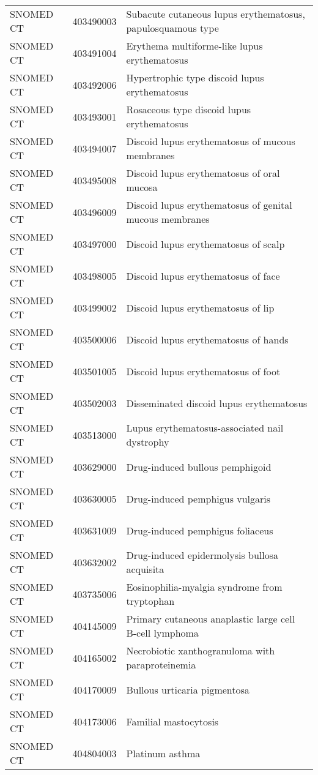 \begin{longtable}{p{}p{}p{}}
  SNOMED CT & 403490003 & Subacute cutaneous lupus erythematosus, papulosquamous type \\ 
  SNOMED CT & 403491004 & Erythema multiforme-like lupus erythematosus \\ 
  SNOMED CT & 403492006 & Hypertrophic type discoid lupus erythematosus \\ 
  SNOMED CT & 403493001 & Rosaceous type discoid lupus erythematosus \\ 
  SNOMED CT & 403494007 & Discoid lupus erythematosus of mucous membranes \\ 
  SNOMED CT & 403495008 & Discoid lupus erythematosus of oral mucosa \\ 
  SNOMED CT & 403496009 & Discoid lupus erythematosus of genital mucous membranes \\ 
  SNOMED CT & 403497000 & Discoid lupus erythematosus of scalp \\ 
  SNOMED CT & 403498005 & Discoid lupus erythematosus of face \\ 
  SNOMED CT & 403499002 & Discoid lupus erythematosus of lip \\ 
  SNOMED CT & 403500006 & Discoid lupus erythematosus of hands \\ 
  SNOMED CT & 403501005 & Discoid lupus erythematosus of foot \\ 
  SNOMED CT & 403502003 & Disseminated discoid lupus erythematosus \\ 
  SNOMED CT & 403513000 & Lupus erythematosus-associated nail dystrophy \\ 
  SNOMED CT & 403629000 & Drug-induced bullous pemphigoid \\ 
  SNOMED CT & 403630005 & Drug-induced pemphigus vulgaris \\ 
  SNOMED CT & 403631009 & Drug-induced pemphigus foliaceus \\ 
  SNOMED CT & 403632002 & Drug-induced epidermolysis bullosa acquisita \\ 
  SNOMED CT & 403735006 & Eosinophilia-myalgia syndrome from tryptophan \\ 
  SNOMED CT & 404145009 & Primary cutaneous anaplastic large cell B-cell lymphoma \\ 
  SNOMED CT & 404165002 & Necrobiotic xanthogranuloma with paraproteinemia \\ 
  SNOMED CT & 404170009 & Bullous urticaria pigmentosa \\ 
  SNOMED CT & 404173006 & Familial mastocytosis \\ 
  SNOMED CT & 404804003 & Platinum asthma \\ 

\end{longtable}
